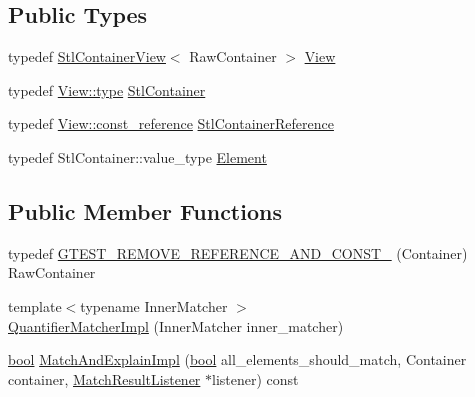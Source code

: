 \subsection*{Public Types}
\begin{DoxyCompactItemize}
\item 
typedef \hyperlink{classtesting_1_1internal_1_1StlContainerView}{Stl\+Container\+View}$<$ Raw\+Container $>$ \hyperlink{classtesting_1_1internal_1_1QuantifierMatcherImpl_aa1e6b1653b6fdee1b0cfc4c58a9059e6}{View}
\item 
typedef \hyperlink{classtesting_1_1internal_1_1StlContainerView_a2b2c63a6dcdbfe63fb0ee121ebf463ba}{View\+::type} \hyperlink{classtesting_1_1internal_1_1QuantifierMatcherImpl_a7faa9a49c627e6db66e0ff9cdc88b6fc}{Stl\+Container}
\item 
typedef \hyperlink{classtesting_1_1internal_1_1StlContainerView_a9cd4f6ed689b3938cdb7b3c4cbf1b36b}{View\+::const\+\_\+reference} \hyperlink{classtesting_1_1internal_1_1QuantifierMatcherImpl_a341dd7815b3c6090d935026daac6e938}{Stl\+Container\+Reference}
\item 
typedef Stl\+Container\+::value\+\_\+type \hyperlink{classtesting_1_1internal_1_1QuantifierMatcherImpl_a6f73e2e5fa853f8b5fdd33d6a1811f9e}{Element}
\end{DoxyCompactItemize}
\subsection*{Public Member Functions}
\begin{DoxyCompactItemize}
\item 
typedef \hyperlink{classtesting_1_1internal_1_1QuantifierMatcherImpl_aa3648a9fce92090dc3987eb10faf16e1}{G\+T\+E\+S\+T\+\_\+\+R\+E\+M\+O\+V\+E\+\_\+\+R\+E\+F\+E\+R\+E\+N\+C\+E\+\_\+\+A\+N\+D\+\_\+\+C\+O\+N\+S\+T\+\_\+} (Container) Raw\+Container
\item 
{\footnotesize template$<$typename Inner\+Matcher $>$ }\\\hyperlink{classtesting_1_1internal_1_1QuantifierMatcherImpl_aef125c9971ea1d02d138cd8fd2af0287}{Quantifier\+Matcher\+Impl} (Inner\+Matcher inner\+\_\+matcher)
\item 
\hyperlink{classbool}{bool} \hyperlink{classtesting_1_1internal_1_1QuantifierMatcherImpl_ab8f64532b70f47fc60f7983ebe5cbfc6}{Match\+And\+Explain\+Impl} (\hyperlink{classbool}{bool} all\+\_\+elements\+\_\+should\+\_\+match, Container container, \hyperlink{classtesting_1_1MatchResultListener}{Match\+Result\+Listener} $\ast$listener) const
\end{DoxyCompactItemize}

